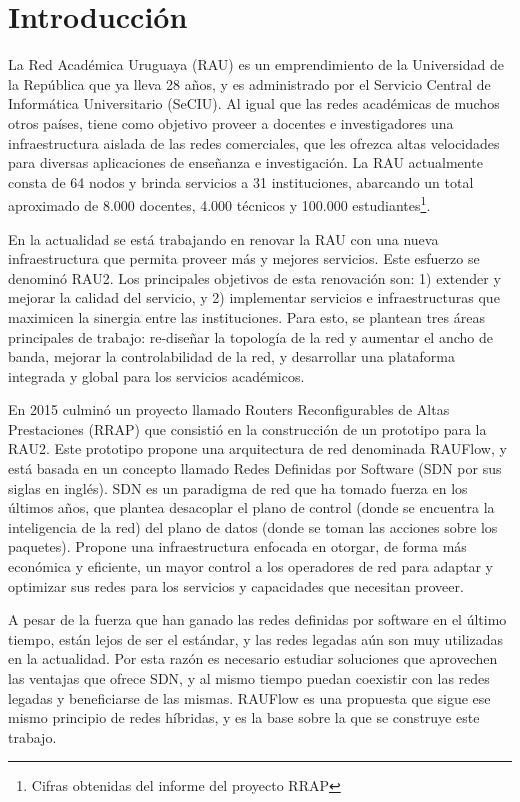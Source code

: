 \chapter{Introducción}
La Red Académica Uruguaya (RAU) es un emprendimiento de la Universidad de la República que ya lleva 28 años, y es administrado por el Servicio Central de Informática Universitario (SeCIU). Al igual que las redes académicas de muchos otros países, tiene como objetivo proveer a docentes e investigadores una infraestructura aislada de las redes comerciales, que les ofrezca altas velocidades para diversas aplicaciones de enseñanza e investigación. La RAU actualmente consta de 64 nodos y brinda servicios a 31 instituciones, abarcando un total aproximado de 8.000 docentes, 4.000 técnicos y 100.000 estudiantes\footnote{Cifras obtenidas del informe del proyecto RRAP}.

En la actualidad se está trabajando en renovar la RAU con una nueva infraestructura que permita proveer más y mejores servicios. Este esfuerzo se denominó RAU2. Los principales objetivos de esta renovación son: 1) extender y mejorar la calidad del servicio, y 2) implementar servicios e infraestructuras que maximicen la sinergia entre las instituciones. Para esto, se plantean tres áreas principales de trabajo: re-diseñar la topología de la red y aumentar el ancho de banda, mejorar la controlabilidad de la red, y desarrollar una plataforma integrada y global para los servicios académicos.

En 2015 culminó un proyecto llamado Routers Reconfigurables de Altas Prestaciones (RRAP) \cite{proyecto-rrap} que consistió en la construcción de un prototipo para la RAU2. Este prototipo propone una arquitectura de red denominada RAUFlow, y está basada en un concepto llamado Redes Definidas por Software (SDN por sus siglas en inglés). SDN es un paradigma de red que ha tomado fuerza en los últimos años, que plantea desacoplar el plano de control (donde se encuentra la inteligencia de la red) del plano de datos (donde se toman las acciones sobre los paquetes). Propone una infraestructura enfocada en otorgar, de forma más económica y eficiente, un mayor control a los operadores de red para adaptar y optimizar sus redes para los servicios y capacidades que necesitan proveer.

A pesar de la fuerza que han ganado las redes definidas por software en el último tiempo, están lejos de ser el estándar, y las redes legadas aún son muy utilizadas en la actualidad. Por esta razón es necesario estudiar soluciones que aprovechen las ventajas que ofrece SDN, y al mismo tiempo puedan coexistir con las redes legadas y beneficiarse de las mismas. RAUFlow es una propuesta que sigue ese mismo principio de redes híbridas, y es la base sobre la que se construye este trabajo.
\graphicspath{{Chapter1/Figs/}}

